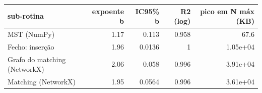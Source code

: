 \begin{tabular}{lrrrr}
\hline
sub-rotina & expoente b & IC95\% b & R2 (log) & pico em N máx (KB) \\
\hline
MST (NumPy) & 1.17 & 0.113 & 0.958 & 67.6 \\
Fecho: inserção & 1.96 & 0.0136 & 1 & 1.05e+04 \\
Grafo do matching (NetworkX) & 2.06 & 0.058 & 0.996 & 3.91e+04 \\
Matching (NetworkX) & 1.95 & 0.0564 & 0.996 & 3.61e+04 \\
\hline
\end{tabular}
